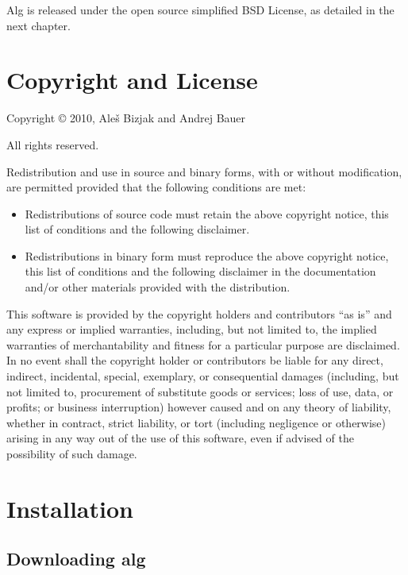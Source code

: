 \documentclass{report}
\begin{document}
Alg is released under the open source simplified BSD License, as
detailed in the next chapter.

\chapter{Copyright and License}
\label{cha:copyr-license}

\noindent
Copyright {\copyright} 2010, Ale\v{s} Bizjak and Andrej Bauer

\bigskip

\noindent
All rights reserved.

\bigskip

\noindent
Redistribution and use in source and binary forms, with or without
modification, are permitted provided that the following conditions are
met:
%
\begin{itemize}
\item Redistributions of source code must retain the above copyright
  notice, this list of conditions and the following disclaimer.
\item Redistributions in binary form must reproduce the above
  copyright notice, this list of conditions and the following
  disclaimer in the documentation and/or other materials provided with
  the distribution.
\end{itemize}

This software is provided by the copyright holders and contributors
``as is'' and any express or implied warranties, including, but not
limited to, the implied warranties of merchantability and fitness for
a particular purpose are disclaimed. In no event shall the copyright
holder or contributors be liable for any direct, indirect, incidental,
special, exemplary, or consequential damages (including, but not
limited to, procurement of substitute goods or services; loss of use,
data, or profits; or business interruption) however caused and on any
theory of liability, whether in contract, strict liability, or tort
(including negligence or otherwise) arising in any way out of the use
of this software, even if advised of the possibility of such damage.

\chapter{Installation}
\label{sec:installation}

\section{Downloading alg}
\label{sec:how-obtain-alg}
\end{document}
